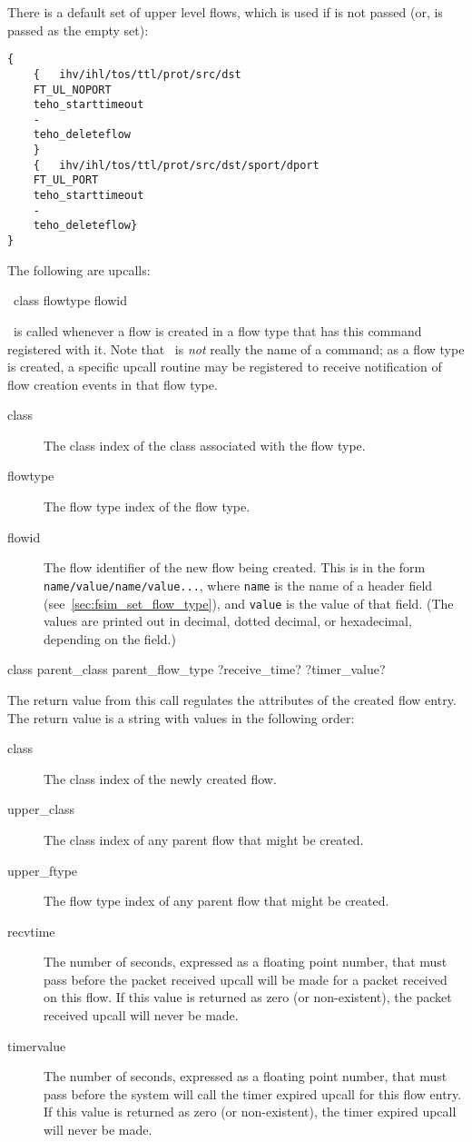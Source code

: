 \documentclass{article}
\begin{document}
There is a default set of upper level flows, which is used if
 is not passed (or, is passed as the empty set):
\begin{verbatim}
{
    {   ihv/ihl/tos/ttl/prot/src/dst
	FT_UL_NOPORT
	teho_starttimeout
	-
	teho_deleteflow
    }
    {	ihv/ihl/tos/ttl/prot/src/dst/sport/dport
	FT_UL_PORT
	teho_starttimeout
	-
	teho_deleteflow}
}
\end{verbatim}

\manend

The following are upcalls:


\SYNOPSIS \cmdname\ class flowtype flowid

\DESCRIPTION

\cmdname\ is called whenever a flow is created in a flow type that has
this command registered with it.  Note that \cmdname\ is \emph{not}
really the name of a command; as a flow type is created, a specific upcall
routine may be registered to receive notification of flow creation
events in that flow type.

\begin{description}
\item[class] The class index of the class associated with the flow type.
\item[flowtype] The flow type index of the flow type.
\item[flowid] The flow identifier of the new flow being created.  This
is in the form \texttt{name/value/name/value...}, where \texttt{name}
is the name of a header field (see~\ref{sec:fsim_set_flow_type}),
and \texttt{value} is the value of that field.  (The values are printed
out in decimal, dotted decimal, or hexadecimal, depending on the
field.)
\end{description}

\RETURNVALUES class parent\_class parent\_flow\_type ?receive\_time?
?timer\_value?

\RETURNDESC
The return value from this call regulates the attributes of the created
flow entry.  The return value is a string with values in the following
order:

\begin{description}
\item[class] The class index of the newly created flow.
\item[upper\_class] The class index of any parent flow that might be created.
\item[upper\_ftype] The flow type index of any parent flow that might be
created.
\item[recvtime] The number of seconds, expressed as a floating point
number, that must pass before the packet received upcall will be made
for a packet received on this flow.  If this value is returned as zero
(or non-existent), the packet received upcall will never be made.
\item[timervalue] The number of seconds, expressed as a floating point
number, that must pass before the system will call the timer expired
upcall for this flow entry.  If this value is returned as zero
(or non-existent), the timer expired upcall will never be made.
\end{description}
\end{document}
